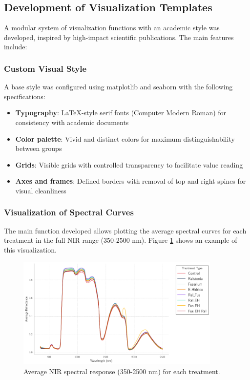 \documentclass[12pt,a4paper]{article}
\begin{document}
\subsection{Development of Visualization Templates}

A modular system of visualization functions with an academic style was developed, inspired by high-impact scientific publications. The main features include:

\subsubsection{Custom Visual Style}

A base style was configured using matplotlib and seaborn with the following specifications:

\begin{itemize}
    \item \textbf{Typography}: LaTeX-style serif fonts (Computer Modern Roman) for consistency with academic documents
    \item \textbf{Color palette}: Vivid and distinct colors for maximum distinguishability between groups
    \item \textbf{Grids}: Visible grids with controlled transparency to facilitate value reading
    \item \textbf{Axes and frames}: Defined borders with removal of top and right spines for visual cleanliness
\end{itemize}

\subsubsection{Visualization of Spectral Curves}

The main function developed allows plotting the average spectral curves for each treatment in the full NIR range (350-2500 nm). Figure \ref{fig:spectral_curves} shows an example of this visualization.

\begin{figure}[H]
    \centering
    \includegraphics[width=0.9\textwidth]{Plots/Average_NIR_Spectrar_reponce_by_treatment}
    \caption{Average NIR spectral response (350-2500 nm) for each treatment. }
    \label{fig:spectral_curves}
\end{figure}
\end{document}
